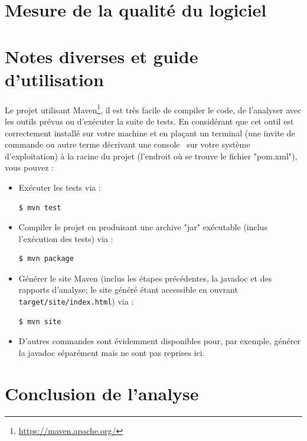 \documentclass[12pt, openany]{report}
\begin{document}
\section{Mesure de la qualité du logiciel} 
\section{Notes diverses et guide d'utilisation}
Le projet utilisant Maven\footnote{\url{https://maven.apache.org/}}, il est très facile de compiler le code, de l'analyser avec les outils prévus ou d'exécuter la suite de tests.
En considérant que cet outil est correctement installé sur votre machine et en plaçant un terminal (une invite de commande ou autre terme décrivant une \og console \fg \, sur votre système d'exploitation) à la racine du projet (l'endroit où se trouve le fichier "pom.xml"), vous pouvez :
\begin{itemize}
	\item Exécuter les tests via :
	\begin{lstlisting}[language=bash]
	$ mvn test
	\end{lstlisting}
	\item Compiler le projet en produisant une archive "jar" exécutable (inclus l'exécution des tests) via :
	\begin{lstlisting}[language=bash]
	$ mvn package
	\end{lstlisting}
	\item Générer le site Maven (inclus les étapes précédentes, la javadoc et des rapports d'analyse; le site généré étant accessible en ouvrant \nolinkurl{target/site/index.html}) via :
	\begin{lstlisting}[language=bash]
	$ mvn site
	\end{lstlisting}
	\item D'autres commandes sont évidemment disponibles pour, par exemple, générer la javadoc séparément mais ne sont pas reprises ici.
\end{itemize}


\section{Conclusion de l'analyse}





%
%
\end{document}
